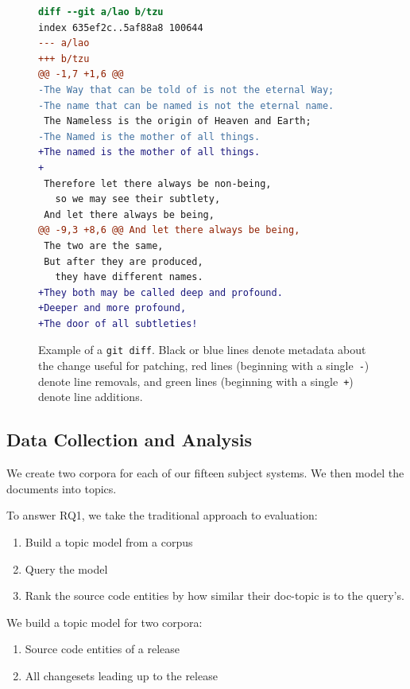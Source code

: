 \begin{figure}[ht]
\centering
\footnotesize
\begin{lstlisting}[language=diff, basicstyle=\ttfamily]
diff --git a/lao b/tzu
index 635ef2c..5af88a8 100644
--- a/lao
+++ b/tzu
@@ -1,7 +1,6 @@
-The Way that can be told of is not the eternal Way;
-The name that can be named is not the eternal name.
 The Nameless is the origin of Heaven and Earth;
-The Named is the mother of all things.
+The named is the mother of all things.
+
 Therefore let there always be non-being,
   so we may see their subtlety,
 And let there always be being,
@@ -9,3 +8,6 @@ And let there always be being,
 The two are the same,
 But after they are produced,
   they have different names.
+They both may be called deep and profound.
+Deeper and more profound,
+The door of all subtleties!
\end{lstlisting}
\caption{Example of a \texttt{git diff}. Black or blue lines denote metadata about the change useful for patching, red lines (beginning with a single~\texttt{-}) denote line removals, and green lines (beginning with a single~\texttt{+}) denote line additions.}
\label{fig:diff}
\vspace{-10pt}
\end{figure}



\subsection{Data Collection and Analysis}

We create two corpora for each of our fifteen subject systems.
We then model the documents into topics.

To answer RQ1, we take the traditional approach to evaluation:

\begin{enumerate}
    \item Build a topic model from a corpus
    \item Query the model
    \item Rank the source code entities by how similar their doc-topic is to the query's.
\end{enumerate}

We build a topic model for two corpora: 
\begin{enumerate}
    \item Source code entities of a release
    \item All changesets leading up to the release
\end{enumerate}

